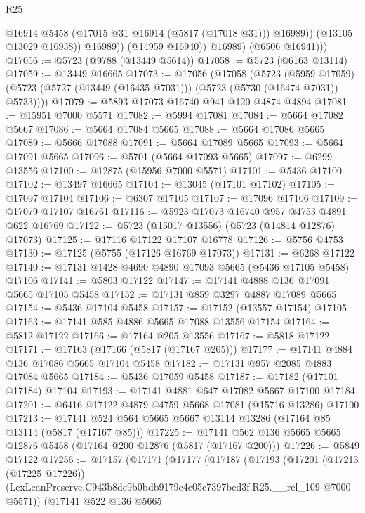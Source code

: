 \begin{lexlean}{R25}
\begin{coremodule}
                      @16914
                      @5458
                      (@17015 @31 @16914 (@5817 (@17018 @31)))
                      @16989))
                  (@13105 @13029 @16938))
                @16989))
            (@14959 @16940))
          @16989)
        (@6506 @16941)))
@17056 := @5723 (@9788 (@13449 @5614))
@17058 := @5723 (@6163 @13114)
@17059 := @13449 @16665
@17073 := @17056
    (@17058
      (@5723
        (@5959 @17059)
        (@5723 (@5727 (@13449 (@16435 @7031))) (@5723 (@5730 (@16474 @7031)) @5733))))
@17079 := @5893 @17073 @16740 @941 @120 @4874 @4894
@17081 := @15951 @7000 @5571
@17082 := @5994 @17081
@17084 := @5664 @17082 @5667
@17086 := @5664 @17084 @5665
@17088 := @5664 @17086 @5665
@17089 := @5666 @17088
@17091 := @5664 @17089 @5665
@17093 := @5664 @17091 @5665
@17096 := @5701 (@5664 @17093 @5665)
@17097 := @6299 @13556
@17100 := @12875 (@15956 @7000 @5571)
@17101 := @5436 @17100
@17102 := @13497 @16665
@17104 := @13045 (@17101 @17102)
@17105 := @17097 @17104
@17106 := @6307 @17105
@17107 := @17096 @17106
@17109 := @17079 @17107 @16761
@17116 := @5923 @17073 @16740 @957 @4753 @4891 @622 @16769
@17122 := @5723 (@15017 @13556) (@5723 (@14814 @12876) @17073)
@17125 := @17116 @17122 @17107 @16778
@17126 := @5756 @4753
@17130 := @17125 (@5755 (@17126 @16769 @17073))
@17131 := @6268 @17122
@17140 := @17131 @1428 @4690 @4890 @17093 @5665 (@5436 @17105 @5458) @17106
@17141 := @5803 @17122
@17147 := @17141 @4888 @136 @17091 @5665 @17105 @5458
@17152 := @17131 @859 @3297 @4887 @17089 @5665
@17154 := @5436 @17104 @5458
@17157 := @17152 (@13557 @17154) @17105
@17163 := @17141 @585 @4886 @5665 @17088 @13556 @17154
@17164 := @5812 @17122
@17166 := @17164 @205 @13556
@17167 := @5818 @17122
@17171 := @17163 (@17166 (@5817 (@17167 @205)))
@17177 := @17141 @4884 @136 @17086 @5665 @17104 @5458
@17182 := @17131 @957 @2085 @4883 @17084 @5665
@17184 := @5436 @17059 @5458
@17187 := @17182 (@17101 @17184) @17104
@17193 := @17141 @4881 @647 @17082 @5667 @17100 @17184
@17201 := @6416 @17122 @4879 @4759 @5668 @17081 (@15716 @13286) @17100
@17213 := @17141 @524 @564 @5665 @5667 @13114 @13286 (@17164 @85 @13114 (@5817 (@17167 @85)))
@17225 := @17141 @562 @136 @5665 @5665 @12876 @5458 (@17164 @200 @12876 (@5817 (@17167 @200)))
@17226 := @5849 @17122
@17256 := @17157
    (@17171
      (@17177
        (@17187
          (@17193
            (@17201
              (@17213 (@17225 @17226))
              (LexLeanPreserve.C943b8de9b0bdb9179c4e05c7397bed3f.R25.__rel_109 @7000 @5571))
            (@17141
              @522
              @136
              @5665

\end{coremodule}
\end{lexlean}
